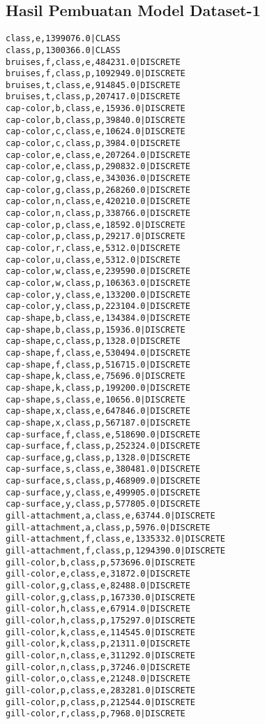 \subsection{Hasil Pembuatan Model Dataset-1}
\label{lamp:E-Hasil Pembuatan Model Dataset-1}
\begin{lstlisting}
class,e,1399076.0|CLASS	
class,p,1300366.0|CLASS	
bruises,f,class,e,484231.0|DISCRETE	
bruises,f,class,p,1092949.0|DISCRETE	
bruises,t,class,e,914845.0|DISCRETE	
bruises,t,class,p,207417.0|DISCRETE	
cap-color,b,class,e,15936.0|DISCRETE	
cap-color,b,class,p,39840.0|DISCRETE	
cap-color,c,class,e,10624.0|DISCRETE	
cap-color,c,class,p,3984.0|DISCRETE	
cap-color,e,class,e,207264.0|DISCRETE	
cap-color,e,class,p,290832.0|DISCRETE	
cap-color,g,class,e,343036.0|DISCRETE	
cap-color,g,class,p,268260.0|DISCRETE	
cap-color,n,class,e,420210.0|DISCRETE	
cap-color,n,class,p,338766.0|DISCRETE	
cap-color,p,class,e,18592.0|DISCRETE	
cap-color,p,class,p,29217.0|DISCRETE	
cap-color,r,class,e,5312.0|DISCRETE	
cap-color,u,class,e,5312.0|DISCRETE	
cap-color,w,class,e,239590.0|DISCRETE	
cap-color,w,class,p,106363.0|DISCRETE	
cap-color,y,class,e,133200.0|DISCRETE	
cap-color,y,class,p,223104.0|DISCRETE	
cap-shape,b,class,e,134384.0|DISCRETE	
cap-shape,b,class,p,15936.0|DISCRETE	
cap-shape,c,class,p,1328.0|DISCRETE	
cap-shape,f,class,e,530494.0|DISCRETE	
cap-shape,f,class,p,516715.0|DISCRETE	
cap-shape,k,class,e,75696.0|DISCRETE	
cap-shape,k,class,p,199200.0|DISCRETE	
cap-shape,s,class,e,10656.0|DISCRETE	
cap-shape,x,class,e,647846.0|DISCRETE	
cap-shape,x,class,p,567187.0|DISCRETE	
cap-surface,f,class,e,518690.0|DISCRETE	
cap-surface,f,class,p,252324.0|DISCRETE	
cap-surface,g,class,p,1328.0|DISCRETE	
cap-surface,s,class,e,380481.0|DISCRETE	
cap-surface,s,class,p,468909.0|DISCRETE	
cap-surface,y,class,e,499905.0|DISCRETE	
cap-surface,y,class,p,577805.0|DISCRETE	
gill-attachment,a,class,e,63744.0|DISCRETE	
gill-attachment,a,class,p,5976.0|DISCRETE	
gill-attachment,f,class,e,1335332.0|DISCRETE	
gill-attachment,f,class,p,1294390.0|DISCRETE	
gill-color,b,class,p,573696.0|DISCRETE	
gill-color,e,class,e,31872.0|DISCRETE	
gill-color,g,class,e,82488.0|DISCRETE	
gill-color,g,class,p,167330.0|DISCRETE	
gill-color,h,class,e,67914.0|DISCRETE	
gill-color,h,class,p,175297.0|DISCRETE	
gill-color,k,class,e,114545.0|DISCRETE	
gill-color,k,class,p,21311.0|DISCRETE	
gill-color,n,class,e,311292.0|DISCRETE	
gill-color,n,class,p,37246.0|DISCRETE	
gill-color,o,class,e,21248.0|DISCRETE	
gill-color,p,class,e,283281.0|DISCRETE	
gill-color,p,class,p,212544.0|DISCRETE	
gill-color,r,class,p,7968.0|DISCRETE	

\end{lstlisting}
